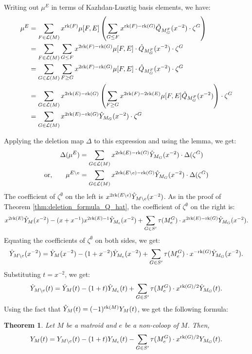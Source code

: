 \documentclass[11pt]{article}
\newcommand{\calL}{\mathcal{L}}
\newcommand{\rank}{\normalfont\text{rk}}
\newtheorem{theorem}{Theorem}
\theoremstyle{remark}
\begin{document}
Writing out $\mu^E$ in terms of Kazhdan-Lusztig basis elements, we have:
\begin{align*}
    \mu^E & = \sum_{F \in \calL(M)} x^{\rank(F)}\mu[F,E]\left( \sum_{G \leq F} x^{\rank(F)-\rank(G)}\hat{Q}_{M_G^F}(x^{-2}) \cdot \zeta^G \right)           \\
          & = \sum_{F \in \calL(M)} \sum_{G \leq F} x^{2\rank(F)-\rank(G)}\mu[F,E]\cdot\hat{Q}_{M_G^F}(x^{-2}) \cdot \zeta^G                                \\
          & = \sum_{G \in \calL(M)} \sum_{F \geq G} x^{2\rank(F)-\rank(G)}\mu[F,E]\cdot\hat{Q}_{M_G^F}(x^{-2}) \cdot \zeta^G                                \\
          & = \sum_{G \in \calL(M)} x^{2\rank(E)-\rank(G)}\left(\sum_{F \geq G} x^{2\rank(F)-2\rank(E)}\mu[F,E]\hat{Q}_{M_G^F}(x^{-2})\right) \cdot \zeta^G \\
          & = \sum_{G \in \calL(M)} x^{2\rank(E)-\rank(G)}\hat{Y}_{M_G}(x^{-2}) \cdot \zeta^G                                                               \\
\end{align*}

Applying the deletion map $\Delta$ to this expression and using the lemma, we get:
\begin{align*}
    \Delta(\mu^E)                      & = \sum_{G \in \calL(M)} x^{2\rank(E)-\rank(G)}\hat{Y}_{M_G}(x^{-2}) \cdot \Delta(\zeta^G)            \\
    \text{or,}\qquad\mu^{E\setminus e} & = \sum_{G \in \calL(M)} x^{2\rank(E\setminus e)-\rank(G)}\hat{Y}_{M_G}(x^{-2}) \cdot \Delta(\zeta^G) \\
\end{align*}
The coefficient of $\zeta^\emptyset$ on the left is $x^{2\rank(E\setminus e)}\hat{Y}_{M\setminus e}(x^{-2})$.
As in the proof of Theorem \ref{thm:deletion_formula_Q_hat}, the coefficient of $\zeta^\emptyset$ on the right is:
\[
    x^{2\rank(E)}\hat{Y}_{M}(x^{-2}) - (x+x^{-1})x^{2\rank(E)-1}\hat{Y}_{M_e}(x^{-2}) +
    \sum_{G \in S'} \tau(M^G_e)\cdot x^{2\rank(E)-\rank(G)}\hat{Y}_{M_G}(x^{-2}).
\]
Equating the coefficients of $\zeta^\emptyset$ on both sides, we get:
\[
    \hat{Y}_{M\setminus e}(x^{-2}) = \hat{Y}_{M}(x^{-2}) - (1+x^{-2})\hat{Y}_{M_e}(x^{-2}) +
    \sum_{G \in S'} \tau(M^G_e)\cdot x^{-\rank(G)}\hat{Y}_{M_G}(x^{-2}).
\]
Substituting $t = x^{-2}$, we get:
\[
    \hat{Y}_{M\setminus e}(t) = \hat{Y}_{M}(t) - (1+t)\hat{Y}_{M_e}(t) +
    \sum_{G \in S'} \tau(M^G_e)\cdot x^{\rank(G)/2}\hat{Y}_{M_G}(t).
\]
Using the fact that $\hat{Y}_{M}(t) = (-1)^{\rank(M)}Y_{M}(t)$, we get the following formula:
\begin{theorem}
    Let $M$ be a matroid and $e$ be a non-coloop of $M$. Then,
\[
    Y_{M}(t) = Y_{M\setminus e}(t) - (1+t)Y_{M_e}(t) -
    \sum_{G \in S'} \tau(M^G_e)\cdot x^{\rank(G)/2}Y_{M_G}(t).
\]

\end{theorem}


\printbibliography %
\end{document}
